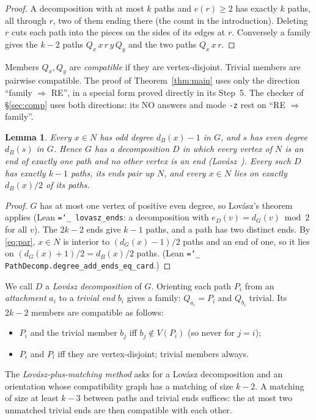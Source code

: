 \documentclass[11pt]{amsart}
\newtheorem{lemma}[theorem]{Lemma}
\theoremstyle{definition}
\newcommand{\lean}[1]{\texttt{\hyphenchar\font=`\_ #1}}
\begin{document}
\begin{proof}
A decomposition with at most $k$ paths and $e(r)\ge 2$ has exactly $k$ paths, all through $r$, two of
them ending there (the count in the introduction). Deleting $r$ cuts each path into the pieces on the
sides of its edges at $r$. Conversely a family gives the $k-2$ paths $Q_x\,x\,r\,y\,Q_y$ and the two
paths $Q_x\,x\,r$.
\end{proof}

Members $Q_x,Q_y$ are \emph{compatible} if they are vertex-disjoint. Trivial members are pairwise
compatible. The proof of Theorem~\ref{thm:main} uses only the direction ``family $\Rightarrow$ RE'', in
a special form proved directly in its Step~5. The checker of \S\ref{sec:comp} uses both directions:
its NO answers and mode \texttt{-z} rest on ``RE $\Rightarrow$ family''.

\begin{lemma}\label{lem:count}
Every $x\in N$ has odd degree $d_B(x)-1$ in $G$, and $s$ has even degree $d_B(s)$ in $G$. Hence
$G$ has a decomposition $D$ in which every vertex of $N$ is an end of exactly one path and no other
vertex is an end (Lov\'asz~\cite{Lov}). Every such $D$ has exactly $k-1$ paths, its ends pair up
$N$, and every $x\in N$ lies on exactly $d_B(x)/2$ of its paths.
\end{lemma}

\begin{proof}
$G$ has at most one vertex of positive even degree, so Lov\'asz's theorem applies (Lean
\lean{lovasz\_ends}: a decomposition with $e_D(v)=d_G(v)\bmod 2$ for all $v$). The $2k-2$ ends
give $k-1$ paths, and a path has two distinct ends. By \eqref{eq:par}, $x\in N$ is interior to
$(d_G(x)-1)/2$ paths and an end of one, so it lies on $(d_G(x)+1)/2=d_B(x)/2$ paths. (Lean
\lean{PathDecomp.degree\_add\_ends\_eq\_card}.)
\end{proof}

We call $D$ a \emph{Lov\'asz decomposition} of $G$. Orienting each path $P_i$ from an
\emph{attachment} $a_i$ to a \emph{trivial end} $b_i$ gives a family: $Q_{a_i}=P_i$ and $Q_{b_i}$
trivial. Its $2k-2$ members are compatible as follows:
\begin{itemize}[leftmargin=*]
\item $P_i$ and the trivial member $b_j$ iff $b_j\notin V(P_i)$ (so never for $j=i$);
\item $P_i$ and $P_l$ iff they are vertex-disjoint; trivial members always.
\end{itemize}
The \emph{Lov\'asz-plus-matching method} asks for a Lov\'asz decomposition and an orientation whose
compatibility graph has a matching of size $k-2$. A matching of size at least $k-3$ between paths and
trivial ends suffices: the at most two unmatched trivial ends are then compatible with each other.
\end{document}
